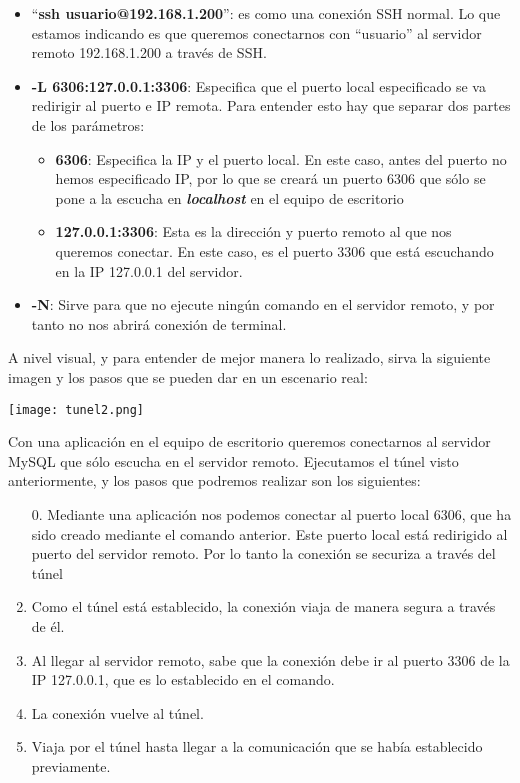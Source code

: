 \begin{itemize}
    \item “\textbf{ssh usuario@192.168.1.200}”: es como una conexión SSH normal. Lo que estamos indicando es que queremos conectarnos con  “usuario” al servidor remoto 192.168.1.200 a través de SSH.
    \item \textbf{-L 6306:127.0.0.1:3306}: Especifica que el puerto local especificado se va redirigir al puerto e IP remota. Para entender esto hay que separar dos partes de los parámetros:
    \begin{itemize}
        \item \textbf{6306}: Especifica la IP y el puerto local. En este caso, antes del puerto no hemos especificado IP, por lo que se creará un puerto 6306 que sólo se pone a la escucha en \textbf{\textit{localhost}} en el equipo de escritorio
        \item \textbf{127.0.0.1:3306}: Esta es la dirección y puerto remoto al que nos queremos conectar. En este caso, es el puerto 3306 que está escuchando en la IP 127.0.0.1 del servidor.
    \end{itemize}
    \item \textbf{-N}: Sirve para que no ejecute ningún comando en el servidor remoto, y por tanto no nos abrirá conexión de terminal.
\end{itemize}

A nivel visual, y para entender de mejor manera lo realizado, sirva la siguiente imagen y los pasos que se pueden dar en un escenario real:

\vspace{-10pt}
\begin{center}
    \texttt{[image: tunel2.png]}
\end{center}
\vspace{-10pt}

Con una aplicación en el equipo de escritorio queremos conectarnos al servidor MySQL que sólo escucha en el servidor remoto. Ejecutamos el túnel visto anteriormente, y los pasos que podremos realizar son los siguientes:

\begin{enumerate}
    \item[0.] Mediante una aplicación nos podemos conectar al puerto local 6306, que ha sido creado mediante el comando anterior. Este puerto local está redirigido al puerto del servidor remoto. Por lo tanto la conexión  se securiza a través del túnel
    \item Como el túnel está establecido, la conexión viaja de manera segura a través de él.
    \item Al llegar al servidor remoto, sabe que la conexión debe ir al puerto 3306 de la IP 127.0.0.1, que es lo establecido en el comando.
    \item La conexión vuelve al túnel.
    \item Viaja por el túnel hasta llegar a la comunicación que se había establecido previamente.
\end{enumerate}

